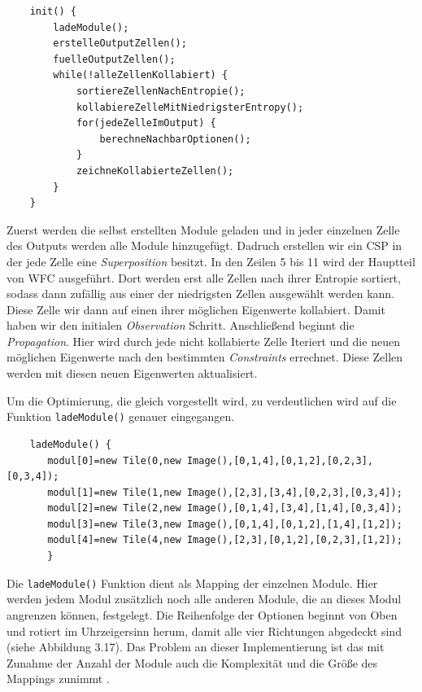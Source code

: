 \documentclass[12pt, a4paper,twoside,openany]{report} %
\begin{document}
\begin{lstlisting}
    init() {
        ladeModule();
        erstelleOutputZellen(); 
        fuelleOutputZellen();
        while(!alleZellenKollabiert) {
            sortiereZellenNachEntropie();
            kollabiereZelleMitNiedrigsterEntropy();
            for(jedeZelleImOutput) {
                berechneNachbarOptionen();
            }
            zeichneKollabierteZellen();
        }
    }
\end{lstlisting}

Zuerst werden die selbst erstellten Module geladen und in jeder einzelnen Zelle des Outputs werden alle Module hinzugefügt.
Dadruch erstellen wir ein CSP in der jede Zelle eine \textit{Superposition} besitzt.
In den Zeilen 5 bis 11 wird der Hauptteil von WFC ausgeführt.
Dort werden erst alle Zellen nach ihrer Entropie sortiert, sodass dann zufällig aus einer der niedrigsten Zellen ausgewählt werden kann.
Diese Zelle wir dann auf einen ihrer möglichen Eigenwerte kollabiert.
Damit haben wir den initialen \textit{Observation} Schritt.
Anschließend beginnt die \textit{Propagation}.
Hier wird durch jede nicht kollabierte Zelle Iteriert und die neuen möglichen Eigenwerte nach den bestimmten \textit{Constraints} errechnet.
Diese Zellen werden mit diesen neuen Eigenwerten aktualisiert.\par
\newpage
Um die Optimierung, die gleich vorgestellt wird, zu verdeutlichen wird auf die Funktion \texttt{ladeModule()} genauer eingegangen.

\begin{lstlisting}
    ladeModule() {
       modul[0]=new Tile(0,new Image(),[0,1,4],[0,1,2],[0,2,3],[0,3,4]);
       modul[1]=new Tile(1,new Image(),[2,3],[3,4],[0,2,3],[0,3,4]);
       modul[2]=new Tile(2,new Image(),[0,1,4],[3,4],[1,4],[0,3,4]);
       modul[3]=new Tile(3,new Image(),[0,1,4],[0,1,2],[1,4],[1,2]);
       modul[4]=new Tile(4,new Image(),[2,3],[0,1,2],[0,2,3],[1,2]);
       }
\end{lstlisting}

Die \texttt{ladeModule()} Funktion dient als Mapping der einzelnen Module.
Hier werden jedem Modul zusätzlich noch alle anderen Module, die an dieses Modul angrenzen können, festgelegt.
Die Reihenfolge der Optionen beginnt von Oben und rotiert im Uhrzeigersinn herum, damit alle vier Richtungen abgedeckt sind {(siehe Abbildung 3.17)}.
Das Problem an dieser Implementierung ist das mit Zunahme der Anzahl der Module auch die Komplexität und die Größe des Mappings zunimmt \cite{Shiffman}.
\end{document}
